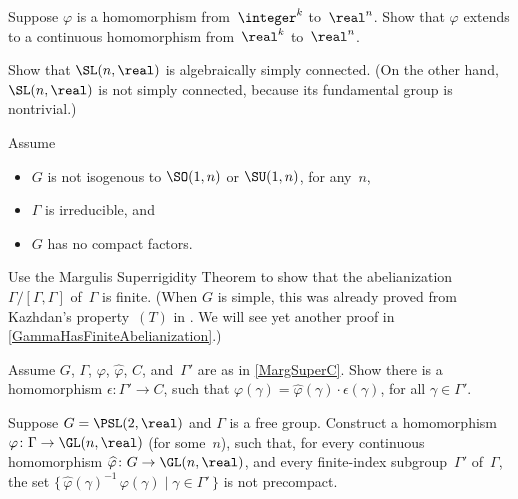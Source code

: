  
\begin{exercises}

\item \label{ZkSuperrigEx}
Suppose $\varphi$ is a homomorphism from~$\integer^k$ to~$\real^n$. Show that $\varphi$ extends to a continuous homomorphism from~$\real^k$ to~$\real^n$.

\item \label{SLnASC}
Show that $\SL(n,\real)$ is algebraically simply connected. (On the other hand, $\SL(n,\real)$ is not simply connected, because its fundamental group is nontrivial.)

\item \label{GNoAbelianization}
Assume 
	\begin{itemize}
	\item $G$ is not isogenous to $\SO(1,n)$ or $\SU(1,n)$, for any~$n$,
	\item $\Gamma$ is irreducible,
	and
	\item $G$ has no compact factors.
	\end{itemize}
Use the Margulis Superrigidity Theorem to show that the abelianization $\Gamma / [\Gamma,\Gamma]$ of~$\Gamma$ is finite.
(When $G$ is simple, this was already proved from Kazhdan's property~$(T)$ in . We will see yet another proof in \cref{GammaHasFiniteAbelianization}.)

\item Assume $G$, $\Gamma$, $\varphi$, $\widehat\varphi$, $C$, and~$\Gamma'$ are as in \cref{MargSuperC}. Show there is a homomorphism $\epsilon \colon \Gamma' \to C$, such that $\varphi(\gamma) = \widehat\varphi(\gamma) \cdot \epsilon(\gamma)$, for all $\gamma \in \Gamma'$.

\item \label{FreeNotSuperrig}
Suppose $G = \PSL(2,\real)$ and $\Gamma$ is a free group.
Construct a homomorphism $\varphi \colon \Gamma \to \GL(n,\real)$ (for some~$n$), such that, for every continuous homomorphism $\widehat\varphi \colon G \to \GL(n,\real)$, and every finite-index subgroup~$\Gamma'$ of~$\Gamma$, the set $\{\, \widehat\varphi(\gamma)^{-1} \, \varphi(\gamma) \mid \gamma \in \Gamma' \,\}$ is not precompact.


\end{exercises}
